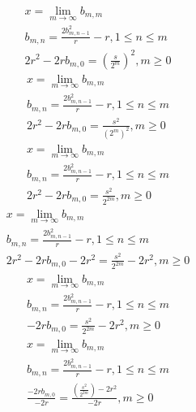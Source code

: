 \documentclass[a4paper,12pt]{report}
\begin{document}
\begin{subequations}
\begin{gather}
x = \lim \limits_{m \to \infty} b_{m,m} \\
b_{m,n} = \frac{2b_{m,n-1}^2}{r} - r, 1 \leq n \leq m \\
2r^2 - 2rb_{m,0} = \left(\frac{s}{2^m}\right)^2, m \geq 0
\end{gather}
\end{subequations}
\begin{subequations}
\begin{gather}
x = \lim \limits_{m \to \infty} b_{m,m} \\
b_{m,n} = \frac{2b_{m,n-1}^2}{r} - r, 1 \leq n \leq m \\
2r^2 - 2rb_{m,0} = \frac{s^2}{\left(2^m\right)^2}, m \geq 0
\end{gather}
\end{subequations}
\begin{subequations}
\begin{gather}
x = \lim \limits_{m \to \infty} b_{m,m} \\
b_{m,n} = \frac{2b_{m,n-1}^2}{r} - r, 1 \leq n \leq m \\
2r^2 - 2rb_{m,0} = \frac{s^2}{2^{2m}}, m \geq 0
\end{gather}
\end{subequations}
\begin{subequations}
\begin{gather}
x = \lim \limits_{m \to \infty} b_{m,m} \\
b_{m,n} = \frac{2b_{m,n-1}^2}{r} - r, 1 \leq n \leq m \\
2r^2 - 2rb_{m,0} - 2r^2 = \frac{s^2}{2^{2m}} - 2r^2, m \geq 0
\end{gather}
\end{subequations}
\begin{subequations}
\begin{gather}
x = \lim \limits_{m \to \infty} b_{m,m} \\
b_{m,n} = \frac{2b_{m,n-1}^2}{r} - r, 1 \leq n \leq m \\
-2rb_{m,0} = \frac{s^2}{2^{2m}} - 2r^2, m \geq 0
\end{gather}
\end{subequations}
\begin{subequations}
\begin{gather}
x = \lim \limits_{m \to \infty} b_{m,m} \\
b_{m,n} = \frac{2b_{m,n-1}^2}{r} - r, 1 \leq n \leq m \\
\frac{-2rb_{m,0}}{-2r} = \frac{\left(\frac{s^2}{2^{2m}}\right) - 2r^2}{-2r}, m \geq 0
\end{gather}
\end{subequations}
\end{document}
